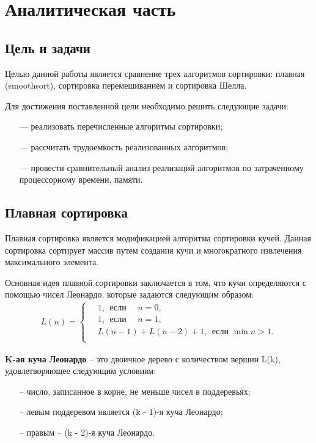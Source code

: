 \chapter{Аналитическая часть}
\section{Цель и задачи}
Целью данной работы является сравнение трех алгоритмов сортировки: плавная (smoothsort), сортировка перемешиванием и сортировка Шелла.


Для достижения поставленной цели необходимо решить следующие задачи:
\begin{itemize}
	\item[---] реализовать перечисленные алгоритмы сортировки;
	\item[---] рассчитать трудоемкость реализованных алгоритмов;
	\item[---] провести сравнительный анализ реализаций алгоритмов по затраченному процессорному времени, памяти.
\end{itemize}

\newpage
\section{Плавная сортировка}

Плавная сортировка является модификацией алгоритма сортировки кучей. Данная сортировка сортирует массив путем создания кучи и многократного извлечения максимального элемента.


Основная идея плавной сортировки заключается в том, что кучи определяются  с помощью чисел Леонардо, которые задаются следующим образом:
\begin{equation}
	\begin{aligned}
		L(n) = \begin{cases}
			\quad1, ~~\text{если }\quad n = 0,\\
			\quad1, ~~\text{если }\quad n = 1,\\
			\quad L(n - 1) + L(n - 2) + 1, ~~\text{если }\min n > 1.\\
		\end{cases}
	\end{aligned}
\end{equation}


\textbf{K-ая куча Леонардо} -- это двоичное дерево с количеством вершин L(k), удовлетворяющее следующим условиям:
\begin{itemize}
\item[--] число, записанное в корне, не меньше чисел в поддеревьях;
\item[--] левым поддеревом является (k - 1)-я куча Леонардо;
\item[--] правым -- (k - 2)-я куча Леонардо.
\end{itemize}

